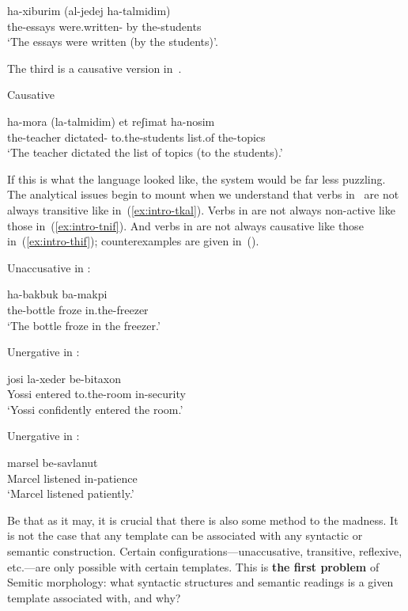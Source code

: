 \begin{exe}
\begin{xlist}
\begin{exe}
\begin{exe}
 		\gll  ha-xiburim  (al-jedej ha-talmidim)\\
 		  the-essays were.written- by the-students\\
 		\glt `The essays were written (by the students)'. 
	
 \z 

The third is a causative version in~{\thif}.
 \begin{exe}
\ex  \label{ex:intro-thif}Causative {\thif} 
		
 		\gll  ha-mora  (la-talmidim) et reʃimat ha-nosim\\
 		  the-teacher dictated- to.the-students  list.of the-topics\\
 		\glt `The teacher dictated the list of topics (to the students).' 
	
 \z 

If this is what the language looked like, the system would be far less puzzling. The analytical issues begin to mount when we understand that verbs in~{\tkal} are not always transitive like in~(\ref{ex:intro-tkal}). Verbs in {\tnif} are not always non-active like those in~(\ref{ex:intro-tnif}). And verbs in {\thif} are not always causative like those in~(\ref{ex:intro-thif}); counterexamples are given in~(\nextx).
 \begin{exe}
 \ex  
 \begin{xlist} 
 	\ex  Unaccusative in {\tkal}: 
		
 		\gll  ha-bakbuk  ba-makpi\\
 		  the-bottle froze in.the-freezer\\
 		\glt `The bottle froze in the freezer.' 
		
 	\ex  Unergative in {\tnif}: 
		
 		\gll  josi  la-xeder be-bitaxon\\
 		  Yossi entered to.the-room in-security\\
 		\glt `Yossi confidently entered the room.' 
	
 	\ex  Unergative in {\thif}: 
		
 		\gll  marsel  be-savlanut\\
 		  Marcel listened in-patience\\
 		\glt `Marcel listened patiently.' 
	
 \z
\z 

Be that as it may, it is crucial that there is also some method to the madness. It is not the case that any template can be associated with any syntactic or semantic construction. Certain configurations---unaccusative, transitive, reflexive, etc.---are only possible with certain templates. This is \textbf{the first problem} of Semitic morphology: what syntactic structures and semantic readings is a given template associated with, and why?


\end{xlist}
\end{exe}
\end{exe}
\end{exe}
\end{exe}
\end{xlist}
\end{exe}
